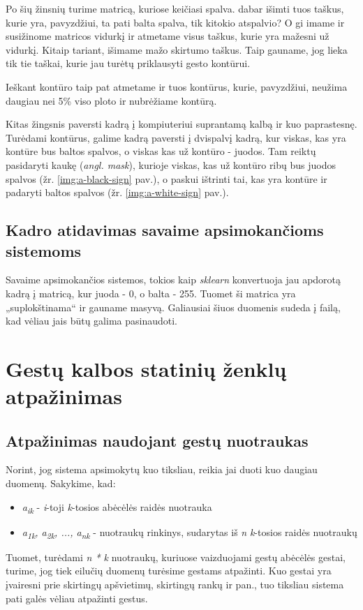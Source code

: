 \documentclass{VUMIFInfKursinis}
\begin{document}
Po šių žinsnių turime matricą, kuriose keičiasi spalva. dabar išimti tuos taškus, kurie yra, pavyzdžiui, ta pati balta spalva, tik kitokio atspalvio? O gi imame ir susižinome matricos vidurkį ir atmetame visus taškus, kurie yra mažesni už vidurkį. Kitaip tariant, išimame mažo skirtumo taškus. Taip gauname, jog lieka tik tie taškai, kurie jau turėtų priklausyti gesto kontūrui. 

Ieškant kontūro taip pat atmetame ir tuos kontūrus, kurie, pavyzdžiui, neužima daugiau nei 5\% viso ploto ir nubrėžiame kontūrą.

Kitas žingsnis paversti kadrą į kompiuteriui suprantamą kalbą ir kuo paprastesnę. Turėdami kontūrus, galime kadrą paversti į dvispalvį kadrą, kur viskas, kas yra kontūre bus baltos spalvos, o viskas kas už kontūro - juodos. Tam reiktų pasidaryti kaukę (\textit{angl. mask}), kurioje viskas, kas už kontūro ribų bus juodos spalvos (žr. \ref{img:a-black-sign} pav.), o paskui ištrinti tai, kas yra kontūre ir padaryti baltos spalvos (žr. \ref{img:a-white-sign} pav.).


\subsection{Kadro atidavimas savaime apsimokančioms sistemoms}
Savaime apsimokančios sistemos, tokios kaip \textit{sklearn} konvertuoja jau apdorotą kadrą į matricą, kur juoda - 0, o balta - 255. Tuomet ši matrica yra „suplokštinama“ ir gauname masyvą. Galiausiai šiuos duomenis sudeda į failą, kad vėliau jais būtų galima pasinaudoti.


\section{Gestų kalbos statinių ženklų atpažinimas}
\subsection{Atpažinimas naudojant gestų nuotraukas}
Norint, jog sistema apsimokytų kuo tiksliau, reikia jai duoti kuo daugiau duomenų. Sakykime, kad:
\begin{itemize}
	\item\textit{a\textsubscript{ik}} - \textit{i}-toji \textit{k}-tosios abėcėlės raidės nuotrauka 
	\item\textit{a\textsubscript{1k}, a\textsubscript{2k}, ..., a\textsubscript{nk}} - nuotraukų rinkinys, sudarytas iš \textit{n} \textit{k}-tosios raidės nuotraukų
\end{itemize}
Tuomet, turėdami \textit{n * k} nuotraukų, kuriuose vaizduojami gestų abėcėlės gestai, turime, jog tiek eilučių duomenų turėsime gestams atpažinti. Kuo gestai yra įvairesni prie skirtingų apšvietimų, skirtingų rankų ir pan., tuo tiksliau sistema pati galės vėliau atpažinti gestus.
\end{document}
